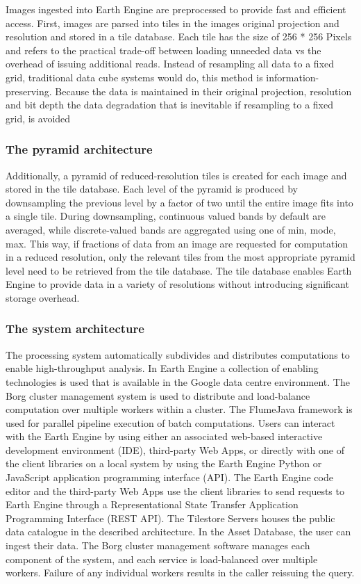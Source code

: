\documentclass[12pt,twoside,a4paper,final]{report}
\begin{document}
Images ingested into Earth Engine are preprocessed to provide fast and efficient access. First, images are parsed into tiles in the images original projection and resolution and stored in a tile database. Each tile has the size of 256 * 256 Pixels and refers to the practical trade-off between loading unneeded data vs the overhead of issuing additional reads. Instead of resampling all data to a fixed grid, traditional data cube systems would do, this method is information-preserving. Because the data is maintained in their original projection, resolution and bit depth the data degradation that is inevitable if resampling to a fixed grid, is avoided

\subsubsection{The pyramid architecture}

Additionally, a pyramid of reduced-resolution tiles is created for each image and stored in the tile database. Each level of the pyramid is produced by downsampling the previous level by a factor of two until the entire image fits into a single tile. During downsampling, continuous valued bands by default are averaged, while discrete-valued bands are aggregated using one of min, mode, max. This way, if fractions of data from an image are requested for computation in a reduced resolution, only the relevant tiles from the most appropriate pyramid level need to be retrieved from the tile database. The tile database enables Earth Engine to provide data in a variety of resolutions without introducing significant storage overhead.

\subsubsection{The system architecture}

The processing system automatically subdivides and distributes computations to enable high-throughput analysis. In Earth Engine a collection of enabling technologies is used that is available in the Google data centre environment. The Borg cluster management system is used to distribute and load-balance computation over multiple workers within a cluster. The FlumeJava framework is used for parallel pipeline execution of batch computations.
Users can interact with the Earth Engine by using either an associated web-based interactive development environment (IDE), third-party Web Apps, or directly with one of the client libraries on a local system by using the Earth Engine Python or JavaScript application programming interface (API).
The Earth Engine code editor and the third-party Web Apps use the client libraries to send requests to Earth Engine through a Representational State Transfer Application Programming Interface (REST API). 
The Tilestore Servers houses the public data catalogue in the described architecture. In the Asset Database, the user can ingest their data. 
The Borg cluster management software manages each component of the system, and each service is load-balanced over multiple workers. Failure of any individual workers results in the caller reissuing the query.
\end{document}
